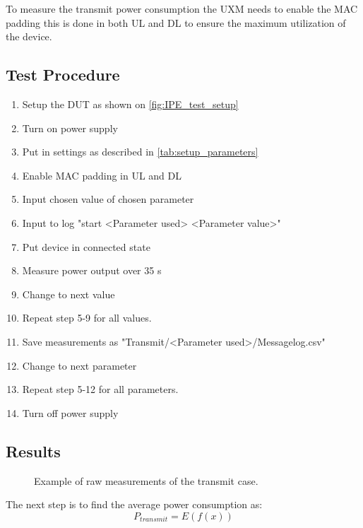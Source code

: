 To measure the transmit power consumption the UXM needs to enable the MAC padding this is done in both UL and DL to ensure the maximum utilization of the device. 

\subsection{Test Procedure}
\begin{enumerate}
\item Setup the \gls{DUT} as shown on \autoref{fig:IPE_test_setup}
\item Turn on power supply 
\item Put in settings as described in \autoref{tab:setup_parameters} 
\item Enable MAC padding in UL and DL
\item Input chosen value of chosen parameter
\item Input to log "start <Parameter used> <Parameter value>"
\item Put device in connected state
\item Measure power output over 35 s
\item Change to next value
\item Repeat step 5-9 for all values.
\item Save measurements as "Transmit/<Parameter used>/Messagelog.csv"
\item Change to next parameter
\item Repeat step 5-12 for all parameters.
\item Turn off power supply
\end{enumerate}

\subsection{Results}
\begin{figure}[H]
\centering
{}
\resizebox{0.6\textwidth}{!}{
}
\caption{Example of raw measurements of the transmit case.}
\label{fig:Transmit_raw}
\end{figure}

The next step is to find the average power consumption as:
\begin{equation}
P_{transmit} = E(f(x))
\end{equation}
\begin{where}
\end{where}

